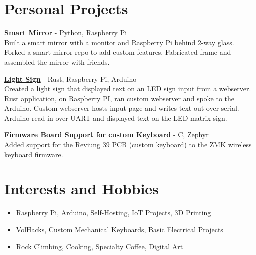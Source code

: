 \documentclass[a4paper,11pt]{article}
\begin{document}
\section{Personal Projects}

   \small{\textbf{\href{https://github.com/ajone239/smartmirror}{Smart Mirror}} \-- Python, Raspberry Pi\\
          Built a smart mirror with a monitor and Raspberry Pi behind 2-way glass.
          Forked a smart mirror repo to add custom features.
          Fabricated frame and assembled the mirror with friends.
          }

   \small{\textbf{\href{https://github.com/ajone239/light_sign}{Light Sign}} \-- Rust, Raspberry Pi, Arduino\\
          Created a light sign that displayed text on an LED sign input from a webserver.
          Rust application, on Raspberry PI, ran custom webserver and spoke to the Arduino.
          Custom webserver hosts input page and writes text out over serial.
          Arduino read in over UART and displayed text on the LED matrix sign.
          }

   \small{\textbf{Firmware Board Support for custom Keyboard} \-- C, Zephyr\\
          Added support for the Reviung 39 PCB (custom keyboard) to the ZMK wireless keyboard firmware.
          }


\section{Interests and Hobbies}
\begin{itemize}[topsep=1pt,itemsep=0pt,partopsep=1pt, parsep=1pt]
   \item Raspberry Pi, Arduino, Self-Hosting, IoT Projects, 3D Printing
   \item VolHacks, Custom Mechanical Keyboards, Basic Electrical Projects
   \item Rock Climbing, Cooking, Specialty Coffee, Digital Art
\end{itemize}
\end{document}
